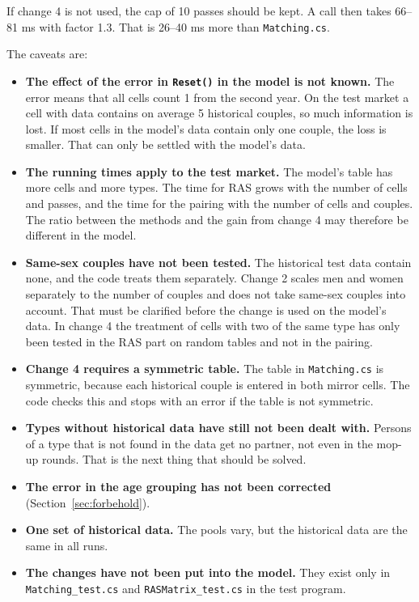 \documentclass[12pt,a4paper]{article}
\newcommand{\kode}[1]{\texttt{#1}}
\begin{document}
If change 4 is not used, the cap of 10 passes should be kept. A call then takes 66--81 ms with
factor 1.3. That is 26--40 ms more than \kode{Matching.cs}.

The caveats are:

\begin{itemize}
\item \textbf{The effect of the error in \kode{Reset()} in the model is not known.} The error means
that all cells count 1 from the second year. On the test market a cell with data contains on
average 5 historical couples, so much information is lost. If most cells in the model's data
contain only one couple, the loss is smaller. That can only be settled with the model's data.
\item \textbf{The running times apply to the test market.} The model's table has more cells and
more types. The time for RAS grows with the number of cells and passes, and the time for the
pairing with the number of cells and couples. The ratio between the methods and the gain from
change 4 may therefore be different in the model.
\item \textbf{Same-sex couples have not been tested.} The historical test data contain none, and
the code treats them separately. Change 2 scales men and women separately to the number of couples
and does not take same-sex couples into account. That must be clarified before the change is used
on the model's data. In change 4 the treatment of cells with two of the same type has only been
tested in the RAS part on random tables and not in the pairing.
\item \textbf{Change 4 requires a symmetric table.} The table in \kode{Matching.cs} is symmetric,
because each historical couple is entered in both mirror cells. The code checks this and stops with
an error if the table is not symmetric.
\item \textbf{Types without historical data have still not been dealt with.} Persons of a type that
is not found in the data get no partner, not even in the mop-up rounds. That is the next thing that
should be solved.
\item \textbf{The error in the age grouping has not been corrected} (Section~\ref{sec:forbehold}).
\item \textbf{One set of historical data.} The pools vary, but the historical data are the same in
all runs.
\item \textbf{The changes have not been put into the model.} They exist only in
\kode{Matching\_test.cs} and \kode{RASMatrix\_test.cs} in the test program.
\end{itemize}
\end{document}
